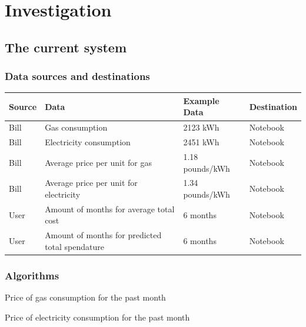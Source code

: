 \section{Investigation}

\subsection{The current system}

\subsubsection{Data sources and destinations}
\begin{center}
\begin{tabular}{|l|l|p{4cm}|l|}
	\hline
	\textbf{Source} & \textbf{Data} & \textbf{Example Data} & \textbf{Destination} \\ \hline
	Bill & Gas consumption & 2123 kWh & Notebook \\ \hline
	Bill & Electricity consumption & 2451 kWh & Notebook \\ \hline
	Bill & Average price per unit for gas & 1.18 pounds/kWh & Notebook \\ \hline
 	Bill & Average price per unit for electricity & 1.34 pounds/kWh & Notebook \\ \hline
	User & Amount of months for average total cost & 6 months & Notebook \\ \hline
	User & Amount of months for predicted total spendature & 6 months & Notebook \\ \hline
\end{tabular}
\label{tab:Data sources and destinations for the current system}
\end{center}

\subsubsection{Algorithms}
\begin{algorithm}[H]
	\caption{Price of gas consumption for the past month}
\begin{algorithmic}[H]
\end{algorithmic}
\end{algorithm}

\begin{algorithm}[H]
	\caption{Price of electricity consumption for the past month}
\begin{algorithmic}[H]
\end{algorithmic}
\end{algorithm}

